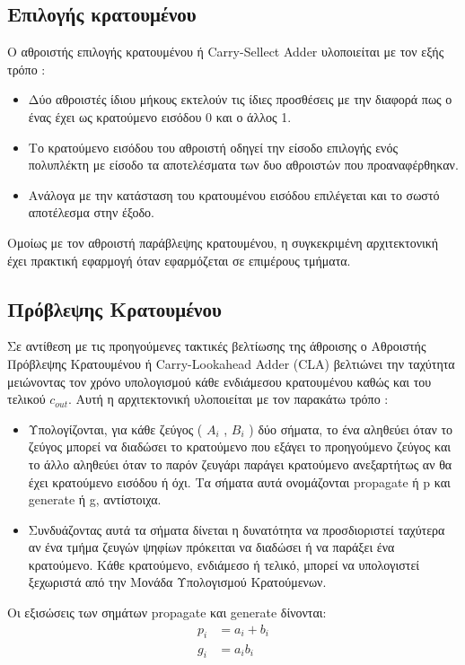 \subsection{Επιλογής κρατουμένου}
Ο αθροιστής επιλογής κρατουμένου ή Carry-Sellect Adder υλοποιείται με τον εξής τρόπο :
\begin{itemize}
  \item Δύο αθροιστές ίδιου μήκους εκτελούν τις ίδιες προσθέσεις με την διαφορά πως ο ένας έχει ως κρατούμενο εισόδου 0 και ο άλλος 1.
  \item Το κρατούμενο εισόδου του αθροιστή οδηγεί την είσοδο επιλογής ενός πολυπλέκτη με είσοδο τα αποτελέσματα των δυο αθροιστών που προαναφέρθηκαν.
  \item Ανάλογα με την κατάσταση του κρατουμένου εισόδου επιλέγεται και το σωστό αποτέλεσμα στην έξοδο.
\end{itemize} 
Ομοίως με τον αθροιστή παράβλεψης κρατουμένου, η συγκεκριμένη αρχιτεκτονική έχει πρακτική εφαρμογή όταν εφαρμόζεται σε επιμέρους τμήματα.








\subsection{Πρόβλεψης Κρατουμένου}
Σε αντίθεση με τις προηγούμενες τακτικές βελτίωσης της άθροισης ο Αθροιστής Πρόβλεψης Κρατουμένου ή Carry-Lookahead Adder (CLA) βελτιώνει την ταχύτητα μειώνοντας τον χρόνο υπολογισμού κάθε ενδιάμεσου κρατουμένου καθώς και του τελικού $c_{out}$.
Αυτή η αρχιτεκτονική υλοποιείται με τον παρακάτω τρόπο :
\begin{itemize}
    \item Υπολογίζονται, για κάθε ζεύγος ( $A_i$ , $B_i$ ) δύο σήματα, το ένα αληθεύει όταν το ζεύγος μπορεί να διαδώσει το κρατούμενο που εξάγει το προηγούμενο ζεύγος και το άλλο αληθεύει όταν το παρόν ζευγάρι παράγει κρατούμενο ανεξαρτήτως αν θα έχει κρατούμενο εισόδου ή όχι. Τα σήματα αυτά ονομάζονται propagate ή p και generate ή g, αντίστοιχα.
    \item Συνδυάζοντας αυτά τα σήματα δίνεται η δυνατότητα να προσδιοριστεί ταχύτερα αν ένα τμήμα ζευγών ψηφίων πρόκειται να διαδώσει ή να παράξει ένα κρατούμενο. Κάθε κρατούμενο, ενδιάμεσο ή τελικό, μπορεί να υπολογιστεί ξεχωριστά από την Μονάδα Υπολογισμού Κρατούμενων.
\end{itemize}

Οι εξισώσεις των σημάτων propagate και generate δίνονται:
\begin{equation}
    \begin{split}
        p_i &= a_i + b_i\\
        g_i &= a_ib_i
    \end{split}
\end{equation}

